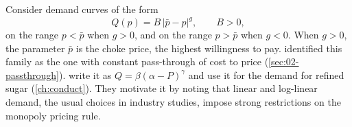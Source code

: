 \begin{example}\label{ex:02-bp}
Consider demand curves of the form
\begin{equation}\label{eq:02-bp-demand}
  Q(p) = B\,\lvert\bar p - p\rvert^{g}, \qquad B > 0,
\end{equation}
on the range $p < \bar p$ when $g > 0$, and on the range $p > \bar p$ when $g < 0$. When $g > 0$, the parameter
$\bar p$ is the choke price, the highest willingness to pay. \citet{BulowPfleiderer1983} identified this family as
the one with constant pass-through of cost to price (\cref{sec:02-passthrough}). \citet{GenesoveMullin1998} write
it as $Q = \beta(\alpha - P)^{\gamma}$ and use it for the demand for refined sugar (\cref{ch:conduct}). They motivate
it by noting that linear and log-linear demand, the usual choices in industry studies, impose strong restrictions on
the monopoly pricing rule.


\end{example}
